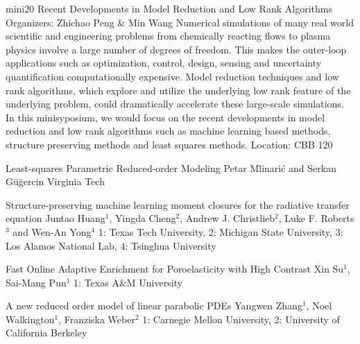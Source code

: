 \mini
{mini20}
{Recent Developments in Model Reduction and Low Rank Algorithms}
{Organizers: Zhichao Peng \& Min Wang}
{Numerical simulations of many real world scientific and engineering problems from chemically reacting flows to plasma physics involve a large number of degrees of freedom. This makes the outer-loop applications such as optimization, control, design, sensing and uncertainty quantification computationally expensive. Model reduction techniques and low rank algorithms, which explore and utilize the underlying low rank feature of the underlying problem, could dramatically accelerate these large-scale simulations. In this minisyposium, we would focus on the recent developments in model reduction and low rank algorithms such as machine learning based methods, structure preserving methods and least squares methods.}
{Location: CBB 120}

\begin{talks}
\item\talk
{Least-squares Parametric Reduced-order Modeling}
{Petar Mlinari\'{c} and Serkan G\"{u}\u{g}ercin}
{Virginia Tech}
\item\talk
{Structure-preserving machine learning moment closures for the radiative transfer equation}
{Juntao Huang$^{1}$, Yingda Cheng$^{2}$, Andrew J. Christlieb$^{2}$, Luke F. Roberts$^{3}$ and Wen-An Yong$^{4}$}
{1: Texas Tech University, 2: Michigan State University, 3: Los Alamos National Lab, 4: Tsinghua University}
\item\talk
{Fast Online Adaptive Enrichment for Poroelasticity with High Contrast}
{Xin Su$^{1}$, Sai-Mang Pun$^{1}$}
{1: Texas A\&M University}
\item\talk
{A new reduced order model of  linear parabolic PDEs}
{Yangwen Zhang$^{1}$, Noel Walkington$^{1}$, Franziska Weber$^{2}$}
{1: Carnegie Mellon University, 2: University of California Berkeley}
\end{talks}
\room

